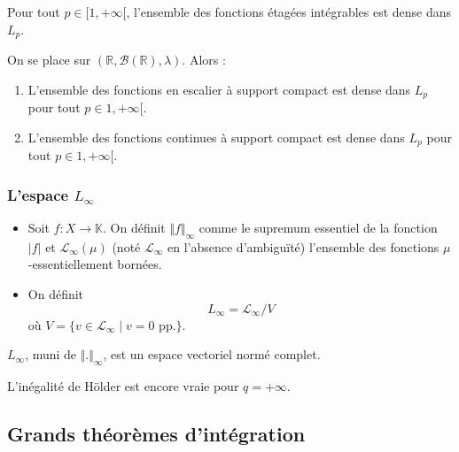 
	\begin{proposition}
		Pour tout $p \in [1, +\infty[$, l'ensemble des fonctions étagées intégrables est dense dans $L_p$.
	\end{proposition}

	\begin{theorem}
		On se place sur $(\mathbb{R}, \mathcal{B}(\mathbb{R}), \lambda)$. Alors :
		\begin{enumerate}[label=(\roman*)]
			\item L'ensemble des fonctions en escalier à support compact est dense dans $L_p$ pour tout $p \in 1, +\infty[$.
			\item L'ensemble des fonctions continues à support compact est dense dans $L_p$ pour tout $p \in 1, +\infty[$.
		\end{enumerate}
	\end{theorem}

	\subsubsection{L'espace \texorpdfstring{$L_\infty$}{L∞}}

	\reference{180}

	\begin{definition}
		\begin{itemize}
			\item Soit $f : X \rightarrow \mathbb{K}$. On définit $\Vert f \Vert_\infty$  comme le supremum essentiel de la fonction $\vert f \vert$ et $\mathcal{L}_\infty(\mu)$ (noté $\mathcal{L}_\infty$ en l'absence d'ambiguïté) l'ensemble des fonctions $\mu$-essentiellement bornées.
			\item On définit
			\[ L_\infty = \mathcal{L}_\infty / V \]
			où $V = \{ v \in \mathcal{L}_\infty \mid v = 0 \text{ pp.} \}$.
		\end{itemize}
	\end{definition}

	\begin{theorem}
		$L_\infty$, muni de $\Vert . \Vert_\infty$, est un espace vectoriel normé complet.
	\end{theorem}

	\begin{remark}
		L'inégalité de Hölder est encore vraie pour $q = +\infty$.
	\end{remark}

	\subsection{Grands théorèmes d'intégration}

